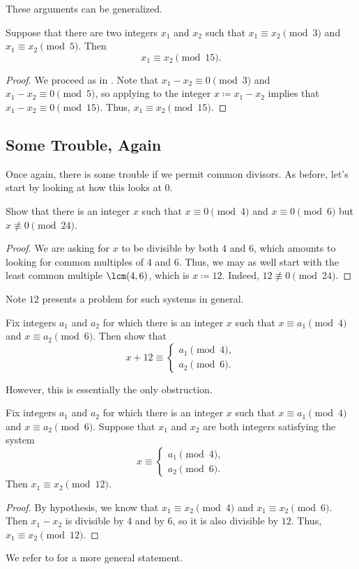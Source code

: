\documentclass{article}
\begin{document}
These arguments can be generalized.
\begin{proposition} \label{prop:crt-uniq-mod-3-mod-5-general}
	Suppose that there are two integers $x_1$ and $x_2$ such that $x_1\equiv x_2\pmod3$ and $x_1\equiv x_2\pmod5$. Then
	\[x_1\equiv x_2\pmod{15}.\]
\end{proposition}
\begin{proof}
	We proceed as in . Note that $x_1-x_2\equiv0\pmod3$ and $x_1-x_2\equiv0\pmod5$, so applying  to the integer $x\coloneqq x_1-x_2$ implies that $x_1-x_2\equiv0\pmod{15}$. Thus, $x_1\equiv x_2\pmod{15}$.
\end{proof}

\subsection{Some Trouble, Again}
Once again, there is some trouble if we permit common divisors. As before, let's start by looking at how this looks at $0$.
\begin{example}
	Show that there is an integer $x$ such that $x\equiv0\pmod4$ and $x\equiv0\pmod6$ but $x\not\equiv0\pmod{24}$.
\end{example}
\begin{proof}
	We are asking for $x$ to be divisible by both $4$ and $6$, which amounts to looking for common multiples of $4$ and $6$. Thus, we may as well start with the least common multiple $\lcm(4,6)$, which is $x\coloneqq12$. Indeed, $12\not\equiv0\pmod{24}$.
\end{proof}
Note $12$ presents a problem for such systems in general.
\begin{exe}
	Fix integers $a_1$ and $a_2$ for which there is an integer $x$ such that $x\equiv a_1\pmod4$ and $x\equiv a_2\pmod6$. Then show that
	\[x+12\equiv\begin{cases}
		a_1\pmod4, \\
		a_2\pmod6.
	\end{cases}\]
\end{exe}
However, this is essentially the only obstruction.
\begin{proposition}
	Fix integers $a_1$ and $a_2$ for which there is an integer $x$ such that $x\equiv a_1\pmod4$ and $x\equiv a_2\pmod6$. Suppose that $x_1$ and $x_2$ are both integers satisfying the system
	\[x\equiv\begin{cases}
		a_1\pmod4, \\
		a_2\pmod6.
	\end{cases}\]
	Then $x_1\equiv x_2\pmod{12}$.
\end{proposition}
\begin{proof}
	By hypothesis, we know that $x_1\equiv x_2\pmod4$ and $x_1\equiv x_2\pmod6$. Then $x_1-x_2$ is divisible by $4$ and by $6$, so it is also divisible by $12$. Thus, $x_1\equiv x_2\pmod{12}$.
\end{proof}
We refer to  for a more general statement.
\end{document}

